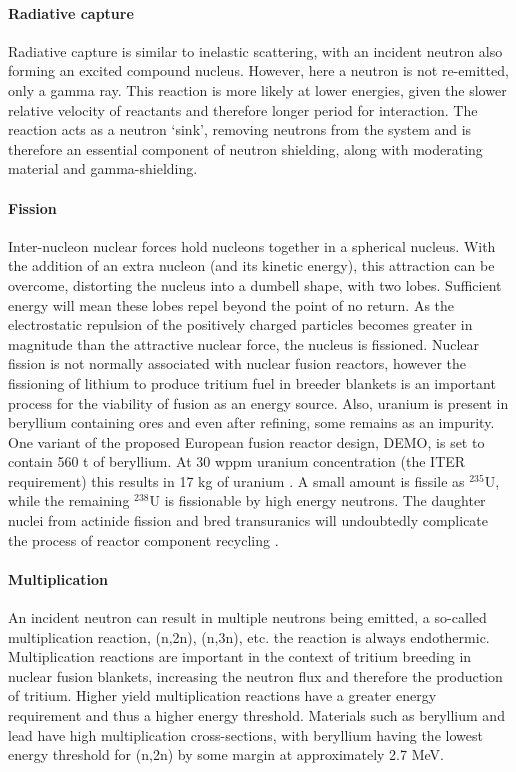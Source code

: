 \paragraph{Radiative capture}
Radiative capture is similar to inelastic scattering, with an incident neutron also forming an excited compound nucleus. However, here a neutron is not re-emitted, only a gamma ray. This reaction is more likely at lower energies, given the slower relative velocity of reactants and therefore longer period for interaction. The reaction acts as a neutron `sink', removing neutrons from the system and is therefore an essential component of neutron shielding, along with moderating material and gamma-shielding.

\paragraph{Fission}
Inter-nucleon nuclear forces hold nucleons together in a spherical nucleus. With the addition of an extra nucleon (and its kinetic energy), this attraction can be overcome, distorting the nucleus into a dumbell shape, with two lobes. Sufficient energy will mean these lobes repel beyond the point of no return. As the electrostatic repulsion of the positively charged particles becomes greater in magnitude than the attractive nuclear force, the nucleus is fissioned. Nuclear fission is not normally associated with nuclear fusion reactors, however the fissioning of lithium to produce tritium fuel in breeder blankets is an important process for the viability of fusion as an energy source. Also, uranium is present in beryllium containing ores and even after refining, some remains as an impurity. One variant of the proposed European fusion reactor design, DEMO, is set to contain 560 t of beryllium. At 30 wppm uranium concentration (the ITER requirement) this results in 17 kg of uranium \cite{kolbasov2016}. A small amount is fissile as $^{235}$U, while the remaining $^{238}$U is fissionable by high energy neutrons. The daughter nuclei from actinide fission and bred transuranics will undoubtedly complicate the process of reactor component recycling \cite{cambi2010}.

\paragraph{Multiplication}
An incident neutron can result in multiple neutrons being emitted, a so-called multiplication reaction, (n,2n), (n,3n), etc. the reaction is always endothermic. Multiplication reactions are important in the context of tritium breeding in nuclear fusion blankets, increasing the neutron flux and therefore the production of tritium. Higher yield multiplication reactions have a greater energy requirement and thus a higher energy threshold. Materials such as beryllium and lead have high multiplication cross-sections, with beryllium having the lowest energy threshold for (n,2n) by some margin at approximately 2.7 MeV.


